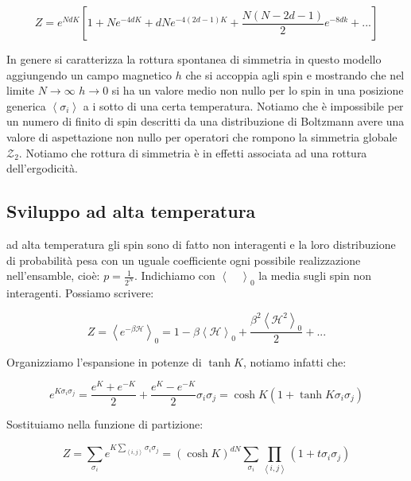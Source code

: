 \documentclass[12pt,a4paper]{article}
\begin{document}
\[
Z = e^{N d K} \left[ 1 + N e^{-4 d K} + d N e^{-4 \left( 2 d - 1 \right) K} + \frac{N (N - 2 d -1)}{2} e^{-8 d k} + ... \right]
\]


In genere si caratterizza la rottura spontanea di simmetria in questo modello aggiungendo un campo magnetico $h$ che si accoppia agli spin e mostrando che nel limite $N \rightarrow \infty$ $h \rightarrow 0$ si ha un valore medio non nullo per lo spin in una posizione generica $\left< \sigma_i \right>$ a i sotto di una certa temperatura. Notiamo che è impossibile per un numero di finito di spin descritti da una distribuzione di Boltzmann avere una valore di aspettazione non nullo per operatori che rompono la simmetria globale $\mathcal{Z}_2$. Notiamo che rottura di simmetria è in effetti associata ad una rottura dell'ergodicità.


\subsection{Sviluppo ad alta temperatura}
ad alta temperatura gli spin sono di fatto non interagenti e la loro distribuzione di probabilità pesa con un uguale coefficiente ogni possibile realizzazione nell'ensamble, cioè: $p = \frac{1}{2^N}$. Indichiamo con $\left< \quad \right> _ 0$ la media sugli spin non interagenti. Possiamo scrivere:

\begin{equation}
Z = \left< e^{-\beta \mathcal{H}} \right> _ 0 = 1 - \beta \left< \mathcal{H} \right> _ 0 + \frac{\beta^2 \left< \mathcal{H}^2 \right> _ 0}{2} + ... 
\end{equation}

Organizziamo l'espansione in potenze di $\tanh K$, notiamo infatti che:

\[
e^{K \sigma_i \sigma_j} = \frac{e^K + e^{-K}}{2} + \frac{e^K - e^{-K}}{2} \sigma_i \sigma_j = \cosh K \left( 1 + \tanh K  \sigma_i \sigma_j \right)
\]

Sostituiamo nella funzione di partizione:

\begin{equation}
Z = \sum_{ {\sigma_i} } e^{K \sum_{\left< i, j \right>} \sigma_i \sigma_j} = \left( \cosh K \right)^{d N} \sum_{ {\sigma_i} } \prod_{\left< i, j \right>} \left( 1 + t \sigma_i \sigma_j \right) 
\end{equation}
\end{document}
